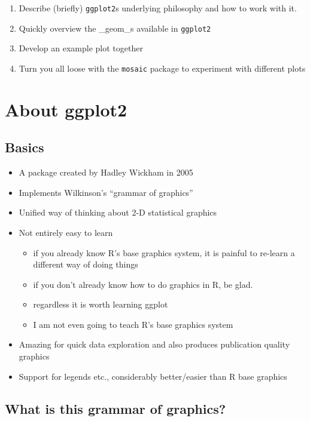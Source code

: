 \documentclass[]{book}
\providecommand{\tightlist}{%
  \setlength{\itemsep}{0pt}\setlength{\parskip}{0pt}}
\theoremstyle{definition}
\theoremstyle{definition}
\theoremstyle{remark}
\begin{document}
\begin{enumerate}
\def\labelenumi{\arabic{enumi}.}
\tightlist
\item
  Describe (briefly) \texttt{ggplot2}s underlying philosophy and how to
  work with it.
\item
  Quickly overview the \_geom\_s available in \texttt{ggplot2}
\item
  Develop an example plot together
\item
  Turn you all loose with the \texttt{mosaic} package to experiment with
  different plots
\end{enumerate}

\section{About ggplot2}\label{about-ggplot2}

\subsection{Basics}\label{basics}

\begin{itemize}
\tightlist
\item
  A package created by Hadley Wickham in 2005
\item
  Implements Wilkinson's ``grammar of graphics''
\item
  Unified way of thinking about 2-D statistical graphics
\item
  Not entirely easy to learn

  \begin{itemize}
  \tightlist
  \item
    if you already know R's base graphics system, it is painful to
    re-learn a different way of doing things
  \item
    if you don't already know how to do graphics in R, be glad.
  \item
    regardless it is worth learning ggplot
  \item
    I am not even going to teach R's base graphics system
  \end{itemize}
\item
  Amazing for quick data exploration and also produces publication
  quality graphics
\item
  Support for legends etc., considerably better/easier than R base
  graphics
\end{itemize}

\subsection{What is this grammar of
graphics?}\label{what-is-this-grammar-of-graphics}
\end{document}
